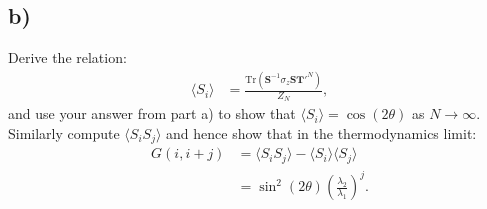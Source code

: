 \documentclass[a4paper]{article}
\newcommand{\trace}{\text{Tr}}
\newcommand{\average}[1]{\langle #1 \rangle}
\begin{document}
\subsection*{b)}
Derive the relation:
\begin{align*}
    \average{S_i} &= \frac{\trace\left(\mathbf{S}^{-1}\sigma_z\mathbf{S}\mathbf{T}'^N\right)}{Z_N},
\end{align*}and use your answer from part a) to show that $\average{S_i} = \cos(2\theta)$ as $N\to\infty$.
Similarly compute $\average{S_iS_j}$ and hence show that in the thermodynamics limit:
\begin{align*}
    G(i, i + j) &=\average{S_iS_j} - \average{S_i}\average{S_j}\\
    &=\sin^2\left(2\theta\right)\left(\frac{\lambda_2}{\lambda_1}\right)^j.
\end{align*}
\end{document}
